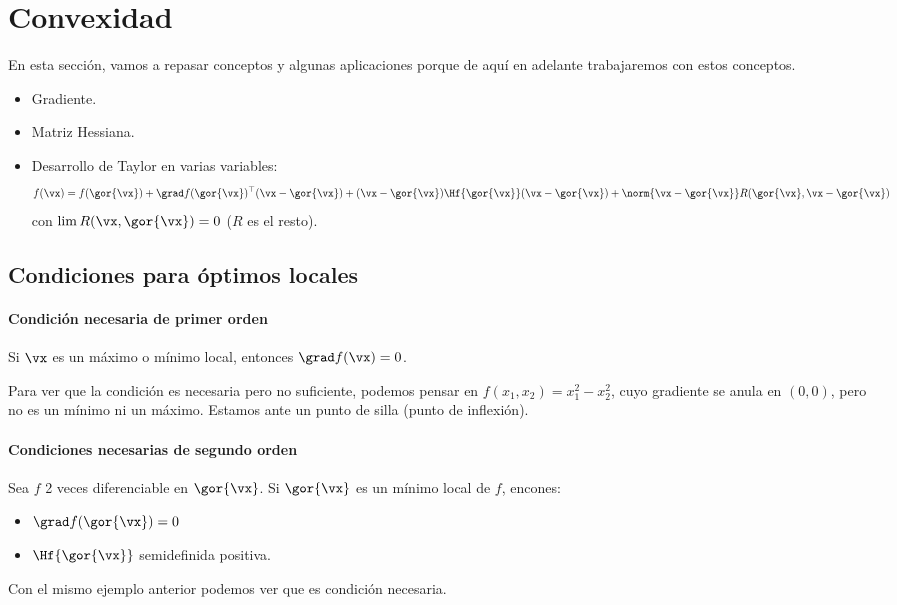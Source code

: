 \section{Convexidad}

En esta sección, vamos a repasar conceptos y algunas aplicaciones porque de aquí en adelante trabajaremos con estos conceptos.


\begin{itemize}
	\item Gradiente.
	\item Matriz Hessiana.
	\item Desarrollo de Taylor en varias variables:
		\[
			f(\vx) = f(\gor{\vx}) + \grad f(\gor{\vx})^\top (\vx-\gor{\vx}) + (\vx-\gor{\vx})\Hf{\gor{\vx}}(\vx-\gor{\vx}) + \norm{\vx-\gor{\vx}}R(\gor{\vx},\vx-\gor{\vx})
		\]
		con $\displaystyle \lim R(\vx,\gor{\vx}) = 0$ ($R$ es el resto).
\end{itemize}

\subsection{Condiciones para óptimos locales}

\paragraph{Condición necesaria de primer orden}
Si $\vx$ es un máximo o mínimo local, entonces $\grad f(\vx) = 0$.

Para ver que la condición es necesaria pero no suficiente, podemos pensar en $f(x_1,x_2) = x_1^2 - x_2^2$, cuyo gradiente se anula en $(0,0)$, pero no es un mínimo ni un máximo. Estamos ante un punto de silla (punto de inflexión).


\paragraph{Condiciones necesarias de segundo orden} Sea $f$ 2 veces diferenciable en $\gor{\vx}$. Si $\gor{\vx}$ es un mínimo local de $f$, encones:
\begin{itemize}
	\item $\grad f(\gor{\vx}) = 0$
	\item $\Hf{\gor{\vx}}$ semidefinida positiva.
\end{itemize}

Con el mismo ejemplo anterior podemos ver que es condición necesaria.

